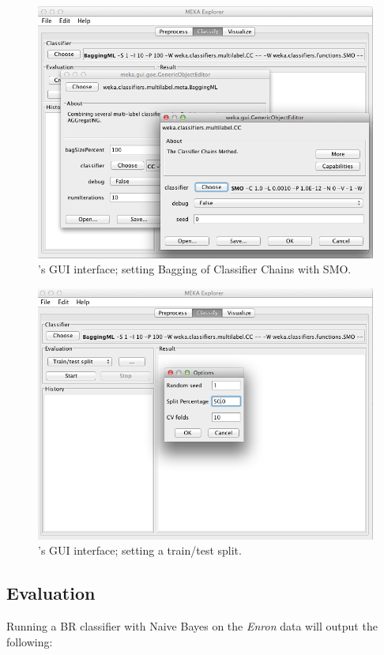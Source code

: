 \documentclass[11pt]{article}
\begin{document}
\begin{figure}
	\includegraphics[height=0.60\textwidth]{GUI02.png}
	\caption{\label{screen:eval} 's GUI interface; setting Bagging of Classifier Chains with SMO.}
\end{figure}


\begin{figure}
	\includegraphics[height=0.60\textwidth]{GUI03.png}
	\caption{\label{screen:split} 's GUI interface; setting a train/test split.}
\end{figure}

\subsection{\label{sec:evaluation}Evaluation}

Running a BR classifier with Naive Bayes on the \textit{Enron} data will output the following:
\end{document}
